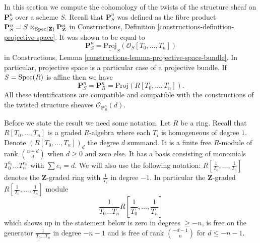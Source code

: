 \noindent
In this section we compute the cohomology of the twists of the
structure sheaf on $\mathbf{P}^n_S$ over a scheme $S$.
Recall that $\mathbf{P}^n_S$ was defined as the fibre product
$
\mathbf{P}^n_S = S \times_{\mathop{\mathrm{Spec}}(\mathbf{Z})} \mathbf{P}^n_{\mathbf{Z}}
$
in Constructions, Definition \ref{constructions-definition-projective-space}.
It was shown to be equal to
$$
\mathbf{P}^n_S = \underline{\text{Proj}}_S(\mathcal{O}_S[T_0, \ldots, T_n])
$$
in Constructions, Lemma \ref{constructions-lemma-projective-space-bundle}.
In particular, projective space is a particular case of a projective bundle.
If $S = \mathop{\mathrm{Spec}}(R)$ is affine then we have
$$
\mathbf{P}^n_S = \mathbf{P}^n_R = \text{Proj}(R[T_0, \ldots, T_n]).
$$
All these identifications are compatible and compatible with the constructions
of the twisted structure sheaves $\mathcal{O}_{\mathbf{P}^n_S}(d)$.

\medskip\noindent
Before we state the result we need some notation.
Let $R$ be a ring.
Recall that $R[T_0, \ldots, T_n]$ is a graded
$R$-algebra where each $T_i$ is homogeneous of degree $1$.
Denote $(R[T_0, \ldots, T_n])_d$ the degree $d$ summand.
It is a finite free $R$-module of rank $\binom{n + d}{d}$
when $d \geq 0$ and zero else.
It has a basis consisting of monomials $T_0^{e_0} \ldots T_n^{e_n}$
with $\sum e_i = d$. We will also use the following notation:
$R[\frac{1}{T_0}, \ldots, \frac{1}{T_n}]$ denotes the $\mathbf{Z}$-graded
ring with $\frac{1}{T_i}$ in degree $-1$. In particular the
$\mathbf{Z}$-graded $R[\frac{1}{T_0}, \ldots, \frac{1}{T_n}]$ module
$$
\frac{1}{T_0 \ldots T_n} R[\frac{1}{T_0}, \ldots, \frac{1}{T_n}]
$$
which shows up in the statement below is zero in degrees
$\geq -n$, is free on the generator $\frac{1}{T_0 \ldots T_n}$
in degree $-n - 1$ and is free of rank $\binom{-d - 1}{n}$ for
$d \leq -n - 1$.

